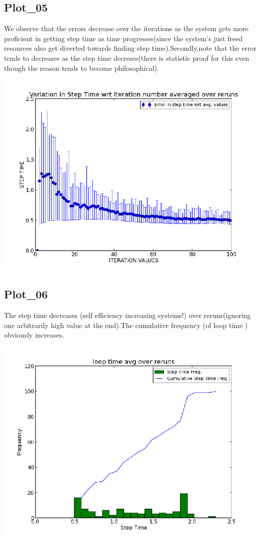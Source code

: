 \documentclass[11pt]{article}
\begin{document}
  \subsection{Plot\_05}
We observe that the errors decrease over the iterations as the system gets more proficient in getting step time as time progresses(since the system’s just freed resources also get diverted towards finding step time).Secondly,note that the error tends to decreases as the step time decreses(there is statistic proof for this even though the reason tends to become philosophical).
 \begin{center}
\includegraphics[scale=0.55]
{images/g18_plot05.png}
\end{center}
	
  \subsection{Plot\_06}
The step time decreases (self efficiency increasing systems!) over reruns(ignoring one arbitrarily high value at the end).The cumulative frequency (of loop time ) obviously increases.
 \begin{center}
\includegraphics[scale=0.55]
{images/g18_plot06.png}
\end{center}
\end{document}
